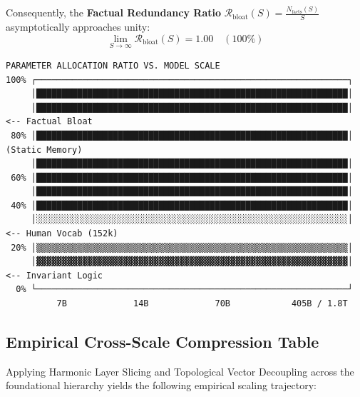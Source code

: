 \documentclass[10pt,twocolumn]{article}
\begin{document}
Consequently, the \textbf{Factual Redundancy Ratio} $\mathcal{R}_{\text{bloat}}(S) = \frac{N_{\text{facts}}(S)}{S}$ asymptotically approaches unity:
\begin{equation}
  \lim_{S \to \infty} \mathcal{R}_{\text{bloat}}(S) = 1.00 \quad (100\%)
\end{equation}

\begin{verbatim}
PARAMETER ALLOCATION RATIO VS. MODEL SCALE
100% ┌─────────────────────────────────────────────────────────────┐
     │█████████████████████████████████████████████████████████████│
     │█████████████████████████████████████████████████████████████│ <-- Factual Bloat
 80% │█████████████████████████████████████████████████████████████│     (Static Memory)
     │█████████████████████████████████████████████████████████████│
 60% │█████████████████████████████████████████████████████████████│
     │█████████████████████████████████████████████████████████████│
 40% │█████████████████████████████████████████████████████████████│
     │░░░░░░░░░░░░░░░░░░░░░░░░░░░░░░░░░░░░░░░░░░░░░░░░░░░░░░░░░░░░░│ <-- Human Vocab (152k)
 20% │▒▒▒▒▒▒▒▒▒▒▒▒▒▒▒▒▒▒▒▒▒▒▒▒▒▒▒▒▒▒▒▒▒▒▒▒▒▒▒▒▒▒▒▒▒▒▒▒▒▒▒▒▒▒▒▒▒▒▒▒▒│
     │▓▓▓▓▓▓▓▓▓▓▓▓▓▓▓▓▓▓▓▓▓▓▓▓▓▓▓▓▓▓▓▓▓▓▓▓▓▓▓▓▓▓▓▓▓▓▓▓▓▓▓▓▓▓▓▓▓▓▓▓▓│ <-- Invariant Logic
  0% └─────────────────────────────────────────────────────────────┘
          7B             14B             70B            405B / 1.8T
\end{verbatim}


\subsection{Empirical Cross-Scale Compression Table}

Applying Harmonic Layer Slicing and Topological Vector Decoupling across the foundational hierarchy yields the following empirical scaling trajectory:
\end{document}

